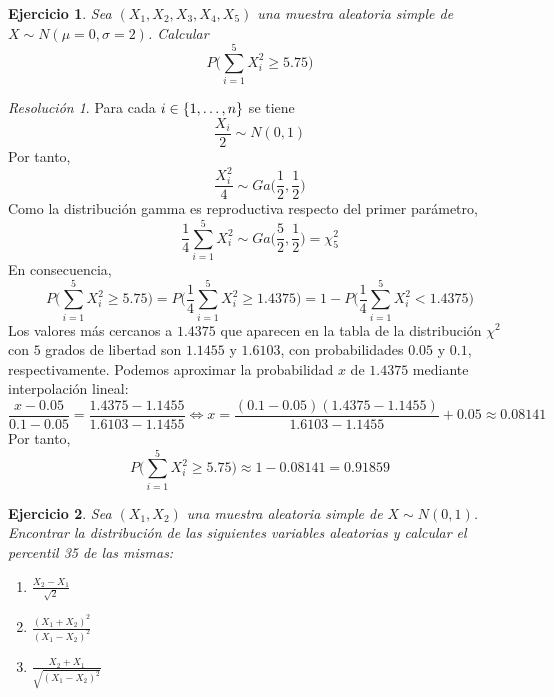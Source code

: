 \documentclass[11pt]{report}
\newtheorem{exercise}{Ejercicio}
\theoremstyle{remark}
\newtheorem*{resolution}{Resolución}
\begin{document}
\begin{exercise}
    Sea $(X_1,X_2,X_3,X_4,X_5)$ una muestra aleatoria simple de $X \sim N(\mu=0,\sigma=2)$. Calcular
    \[P\bigl(\sum_{i=1}^5 X_i^2 \geq 5.75\bigr)\]
\end{exercise}

\begin{resolution}
Para cada $i \in \{1,\mathellipsis,n\}$ se tiene
\[\frac{X_i}{2} \sim N(0,1)\]
Por tanto,
\[\frac{X_i^2}{4} \sim Ga\bigl(\frac{1}{2},\frac{1}{2}\bigr)\]
Como la distribución gamma es reproductiva respecto del primer parámetro,
\[\frac{1}{4}\sum_{i=1}^5 X_i^2 \sim Ga\bigl(\frac{5}{2},\frac{1}{2}\bigr) = \chi^2_5\]
En consecuencia,
    \[P\bigl(\sum_{i=1}^5 X_i^2 \geq 5.75\bigr) = P\bigl(\frac{1}{4}\sum_{i=1}^5 X_i^2 \geq 1.4375\bigr) = 1- P\bigl(\frac{1}{4}\sum_{i=1}^5 X_i^2 < 1.4375\bigr)\]
Los valores más cercanos a $1.4375$ que aparecen en la tabla de la distribución $\chi^2$ con $5$ grados de libertad son $1.1455$ y $1.6103$, con probabilidades $0.05$ y $0.1$, respectivamente. Podemos aproximar la probabilidad $x$ de $1.4375$ mediante interpolación lineal:
\[\frac{x-0.05}{0.1-0.05} = \frac{1.4375-1.1455}{1.6103-1.1455} \iff x = \frac{(0.1-0.05)(1.4375-1.1455)}{1.6103-1.1455}+0.05 \approx 0.08141 \]
Por tanto,
\[P\bigl(\sum_{i=1}^5 X_i^2 \geq 5.75\bigr) \approx 1-0.08141=0.91859\]
\end{resolution}

\begin{exercise}
    Sea $(X_1,X_2)$ una muestra aleatoria simple de $X \sim N(0,1)$. Encontrar la distribución de las siguientes variables aleatorias y calcular el percentil 35 de las mismas:
    \begin{enumerate}
        \item $\displaystyle \frac{X_2-X_1}{\sqrt{2}}$
        \item $\displaystyle \frac{(X_1+X_2)^2}{(X_1-X_2)^2}$
        \item $\displaystyle \frac{X_2+X_1}{\sqrt{(X_1-X_2)^2}}$
    \end{enumerate}
\end{exercise}
\end{document}
